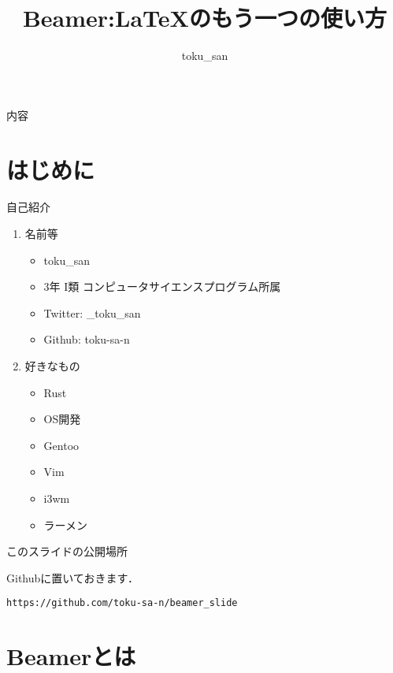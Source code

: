 \documentclass[dvipdfmx,uplatex,a4j,12pt]{beamer}
\begin{document}
\title{Beamer:\LaTeX のもう一つの使い方}
\author{toku\_san}

\begin{frame}
    \titlepage
\end{frame}

\begin{frame}{内容}
    \tableofcontents
\end{frame}

\section{はじめに}

\begin{frame}{自己紹介}

    \begin{enumerate}
        \item 名前等
            \begin{itemize}
                \item toku\_san
                \item 3年 I類 コンピュータサイエンスプログラム所属
                \item Twitter: \_toku\_san
                \item Github: toku-sa-n
            \end{itemize}
        \item 好きなもの
            \begin{itemize}
                \item Rust
                \item OS開発
                \item Gentoo
                \item Vim
                \item i3wm
                \item ラーメン
            \end{itemize}
    \end{enumerate}
\end{frame}

\begin{frame}[fragile]{このスライドの公開場所}

    Githubに置いておきます．

    \begin{verbatim}
https://github.com/toku-sa-n/beamer_slide
    \end{verbatim}
\end{frame}

\section{Beamerとは}
\end{document}
